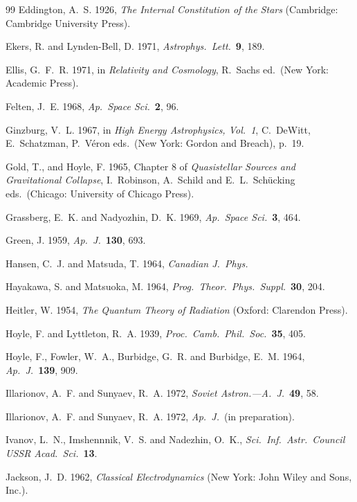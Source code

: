 \begin{thebibliography}{99}
Eddington, A.~S. 1926, \textit{The Internal Constitution of the Stars} (Cambridge: Cambridge
University Press).

Ekers, R. and Lynden-Bell, D. 1971, \textit{Astrophys.\ Lett.}\ \textbf{9}, 189.

Ellis, G.~F.~R. 1971, in \textit{Relativity and Cosmology},
R.~Sachs ed.\ (New York: Academic Press).

Felten, J.~E. 1968, \textit{Ap.\ Space Sci.}\ \textbf{2}, 96.

Ginzburg, V.~L. 1967, in \textit{High Energy Astrophysics, Vol.\ 1},
C.~DeWitt, E.~Schatzman, P.~V\'eron eds.\ (New York: Gordon and Breach), p.~19.

Gold, T., and Hoyle, F. 1965, Chapter 8 of \textit{Quasistellar Sources and
Gravitational Collapse}, I.~Robinson, A.~Schild and E.~L.~Sch\"ucking eds.\ (Chicago:
University of Chicago Press).

Grassberg, E.~K. and Nadyozhin, D.~K. 1969, \textit{Ap.\ Space Sci.}\ \textbf{3}, 464.

Green, J. 1959, \textit{Ap.\ J.}\ \textbf{130}, 693.

Hansen, C.~J. and Matsuda, T. 1964, \textit{Canadian J.\ Phys.}

Hayakawa, S. and Matsuoka, M. 1964, \textit{Prog.\ Theor.\ Phys.\ Suppl.}\ \textbf{30}, 204.

Heitler, W. 1954, \textit{The Quantum Theory of Radiation} (Oxford: Clarendon Press).

Hoyle, F. and Lyttleton, R.~A. 1939, \textit{Proc.\ Camb.\ Phil.\ Soc.}\ \textbf{35}, 405.

Hoyle, F., Fowler, W.~A., Burbidge, G.~R. and Burbidge, E.~M. 1964, \textit{Ap.\ J.}\ \textbf{139}, 909.

Illarionov, A.~F. and Sunyaev, R.~A. 1972, \textit{Soviet Astron.---A.~J.}\ \textbf{49}, 58.

Illarionov, A.~F. and Sunyaev, R.~A. 1972, \textit{Ap.\ J.}\ (in preparation).

Ivanov, L.~N., Imshennnik, V.~S. and Nadezhin, O.~K., \textit{Sci.\ Inf.\ Astr.\ Council USSR Acad.\
Sci.}\ \textbf{13}.

Jackson, J.~D. 1962, \textit{Classical Electrodynamics} (New York: John Wiley and Sons, Inc.).


\end{thebibliography}
